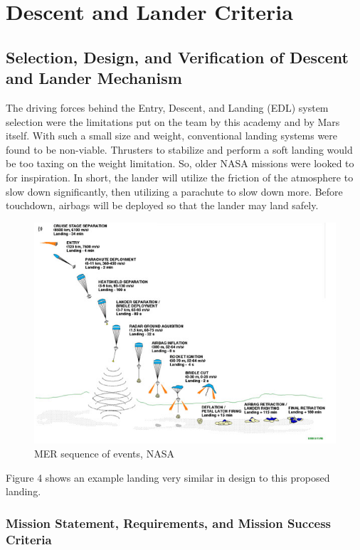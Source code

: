 \documentclass[%
 portrait,
 aapm,
 mph,%
 amsmath,amssymb,
 reprint,%
]{revtex4-2}
\begin{document}
\section{\label{sec:level4}Descent and Lander Criteria}

\subsection{Selection, Design, and Verification of Descent and Lander Mechanism}
The driving forces behind the Entry, Descent, and Landing (EDL) system selection were the limitations put on the team by this academy and by Mars itself. With such a small size and weight, conventional landing systems were found to be non-viable. Thrusters to stabilize and perform a soft landing would be too taxing on the weight limitation. So, older NASA missions were looked to for inspiration. In short, the lander will utilize the friction of the atmosphere to slow down significantly, then utilizing a parachute to slow down more. Before touchdown, airbags will be deployed so that the lander may land safely. 
\begin{figure}
  \includegraphics[width=\textwidth]{DescentandLanding/yLandingSequence.png}
   \caption{MER sequence of events, NASA}
\end{figure} 
Figure 4 shows an example landing very similar in design to this proposed landing.



\subsubsection{Mission Statement, Requirements, and Mission Success Criteria}
\end{document}
